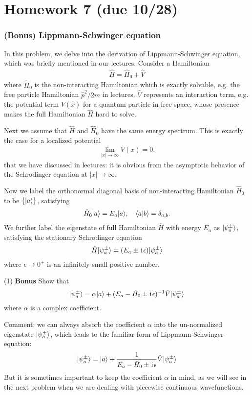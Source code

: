 \chapter{Homework 7 (due 10/28)}

\subsection{(Bonus) Lippmann-Schwinger equation}

In this problem, we delve into the derivation of Lippmann-Schwinger equation, which was briefly mentioned in our lectures. Consider a Hamiltonian 
\begin{align}
\hat H=\hat H_0+\hat V
\end{align}
where $\hat H_0$ is the non-interacting Hamiltonian which is exactly solvable, e.g. the free particle Hamiltonian $\hat p^2/2m$ in lectures. $\hat V$ represents an interaction term, e.g. the potential term $V(\hat x)$ for a quantum particle in free space, whose presence makes the full Hamiltonian $\hat H$ hard to solve. 

Next we assume that $\hat H$ and $\hat H_0$ have the same energy spectrum. This is exactly the case for a localized potential
\begin{align}
\lim_{|x|\rightarrow\infty}V(x)=0.
\end{align}
that we have discussed in lectures: it is obvious from the asymptotic behavior of the Schrodinger equation at $|x|\rightarrow\infty$. 

Now we label the orthonormal diagonal basis of non-interacting Hamiltonian $\hat H_0$ to be $\{|{a}\rangle\}$, satisfying
\begin{align}
\hat H_0|{a}\rangle=E_a|{a}\rangle,~~~\langle{a|b}\rangle=\delta_{a,b}.
\end{align}
We further label the eigenstate of full Hamiltonian $\hat H$ with energy $E_a$ as $|{\psi^\pm_{a}}\rangle$, satisfying the stationary Schrodinger equation
\begin{align}
\hat H|{\psi^\pm_a}\rangle=(E_a\pm\hspace{1pt}\mathrm{i}\hspace{1pt}\epsilon)|{\psi^\pm_a}\rangle
\end{align}
where $\epsilon\rightarrow0^+$ is an infinitely small positive number. 

(1) \textbf{Bonus} Show that 
\begin{align}
|{\psi^\pm_a}\rangle=\alpha|{a}\rangle+(E_a-\hat H_0\pm\hspace{1pt}\mathrm{i}\hspace{1pt}\epsilon)^{-1}\hat V|{\psi^\pm_a}\rangle
\end{align}
where $\alpha$ is a complex coefficient.

Comment: we can always absorb the coefficient $\alpha$ into the un-normalized eigenstate $|{\psi^\pm_a}\rangle$, which leads to the familiar form of Lippmann-Schwinger equation:
\begin{equation}
|{\psi^\pm_a}\rangle=|{a}\rangle+\frac{1}{E_a-\hat H_0\pm\hspace{1pt}\mathrm{i}\hspace{1pt}\epsilon}\hat V|{\psi^\pm_a}\rangle
\end{equation}
But it is sometimes important to keep the coefficient $\alpha$ in mind, as we will see in the next problem when we are dealing with piecewise continuous wavefunctions.

